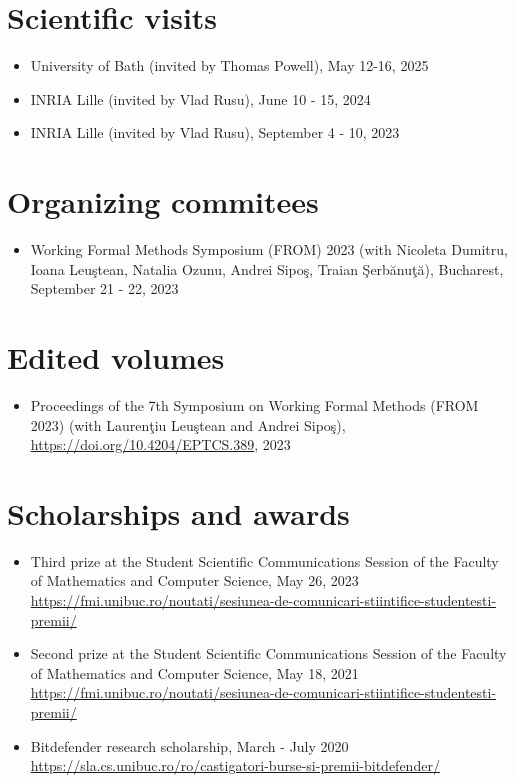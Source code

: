 \documentclass[letterpaper,11pt,oneside]{article}
\begin{document}
\noindent
\section{Scientific visits}
\normalsize 
\begin{itemize}
    \item University of Bath (invited by Thomas Powell), May 12-16, 2025
    \item INRIA Lille (invited by Vlad Rusu), June 10 - 15, 2024
    \item INRIA Lille (invited by Vlad Rusu), September 4 - 10, 2023
\end{itemize}
\mbox{}


\noindent
\section{Organizing commitees}
\normalsize 
\begin{itemize}
    \item Working Formal Methods Symposium (FROM) 2023
    (with Nicoleta Dumitru, Ioana Leu\c{s}tean, Natalia Ozunu, Andrei Sipo\c{s}, Traian \c{S}erb\u{a}nu\c{t}\u{a}), Bucharest, September 21 - 22, 2023
\end{itemize}
\mbox{}

\noindent 
\section{Edited volumes}
\normalsize 
\begin{itemize}
    \item Proceedings of the 7th Symposium on Working Formal Methods (FROM 2023) 
    (with Lauren\c{t}iu Leu\c{s}tean and Andrei Sipo\c{s}), 
    \url{https://doi.org/10.4204/EPTCS.389}, 2023
\end{itemize}

\noindent
\section{Scholarships and awards} 
\normalsize
\begin{itemize}
    \item Third prize at the Student Scientific Communications Session of the Faculty of Mathematics and Computer Science, May 26, 2023 \\ 
    \url{https://fmi.unibuc.ro/noutati/sesiunea-de-comunicari-stiintifice-studentesti-premii/}
    \item Second prize at the Student Scientific Communications Session of the Faculty of Mathematics and Computer Science, May 18, 2021 \\ 
    \url{https://fmi.unibuc.ro/noutati/sesiunea-de-comunicari-stiintifice-studentesti-premii/}
    \item Bitdefender research scholarship, March - July 2020 \\
    \url{https://sla.cs.unibuc.ro/ro/castigatori-burse-si-premii-bitdefender/}
\end{itemize}
\mbox{}
\end{document}
